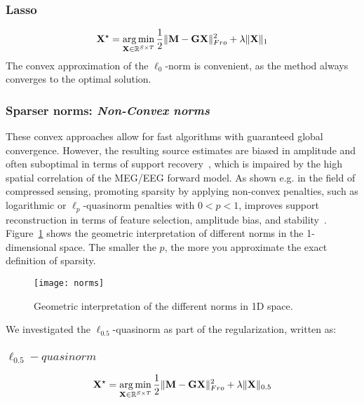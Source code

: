 \adjustwidth{1em}{0pt}
\subsubsection*{Lasso}
\begin{equation} \label{eq_lasso}
	\mathbf{X}^\star = \mathop{\mathrm{arg}\,\mathrm{min}}_{\mathbf{X}\in\mathbb{R}^{S\times T}}\frac{1}{2}\|\mathbf{M}-\mathbf{GX}\|_{Fro}^2 + \lambda\|\mathbf{X}\|_1
\end{equation}
\endadjustwidth
The convex approximation of the $\ell_0$-norm is convenient, as the method always converges to the optimal solution.

\subsubsection*{Sparser norms: \textit{Non-Convex norms}}
These convex approaches allow for fast algorithms with guaranteed global convergence. However, the resulting source estimates are biased in amplitude and often suboptimal in terms of support recovery~\cite{candes2008enhancing}, which is impaired by the high spatial correlation of the MEG/EEG forward model. As shown e.g. in the field of compressed sensing, promoting sparsity by applying non-convex penalties, such as logarithmic or $\ell_p$-quasinorm penalties with $0 < p < 1$, improves support reconstruction in terms of feature selection, amplitude bias, and stability~\cite{candes2008enhancing,chartrand2007exact,saab2008stable}. Figure~\ref{fig:norms} shows the geometric interpretation of different norms in the 1-dimensional space. The smaller the $p$, the more you approximate the exact definition of sparsity. 

\begin{figure}
\centering
	\texttt{[image: norms]}
    \caption{Geometric interpretation of the different norms in 1D space.}
	\label{fig:norms}
\end{figure}

We investigated the $\ell_{0.5}$-quasinorm as part of the regularization, written as:
\adjustwidth{1em}{0pt}
\subsubsection*{$\ell_{0.5}-quasinorm$}
\begin{equation} \label{eq_quasinorm}
	\mathbf{X}^\star = \mathop{\mathrm{arg}\,\mathrm{min}}_{\mathbf{X}\in\mathbb{R}^{S\times T}}\frac{1}{2}\|\mathbf{M}-\mathbf{GX}\|_{Fro}^2 + \lambda\|\mathbf{X}\|_{0.5}
\end{equation}
\endadjustwidth

